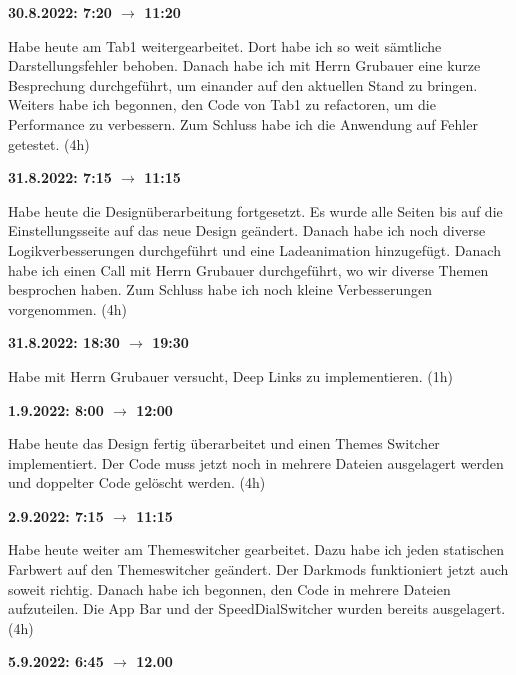 \vspace{0.5cm}

\textbf{30.8.2022: 7:20 $\rightarrow$ 11:20} \

Habe heute am Tab1 weitergearbeitet. Dort habe ich so weit sämtliche Darstellungsfehler behoben. Danach habe ich mit Herrn Grubauer eine kurze Besprechung durchgeführt, um einander auf den aktuellen Stand zu bringen. Weiters habe ich begonnen, den Code von Tab1 zu refactoren, um die Performance zu verbessern. Zum Schluss habe ich die Anwendung auf Fehler getestet. (4h)

\vspace{0.5cm}

\textbf{31.8.2022: 7:15 $\rightarrow$ 11:15} \

Habe heute die Designüberarbeitung fortgesetzt. Es wurde alle Seiten bis auf die Einstellungsseite auf das neue Design geändert. Danach habe ich noch diverse Logikverbesserungen durchgeführt und eine Ladeanimation hinzugefügt. Danach habe ich einen Call mit Herrn Grubauer durchgeführt, wo wir diverse Themen besprochen haben. Zum Schluss habe ich noch kleine Verbesserungen vorgenommen. (4h)

\vspace{0.5cm}

\textbf{31.8.2022: 18:30 $\rightarrow$ 19:30} \

Habe mit Herrn Grubauer versucht, Deep Links zu implementieren. (1h)

\vspace{0.5cm}

\textbf{1.9.2022: 8:00 $\rightarrow$ 12:00} \

Habe heute das Design fertig überarbeitet und einen Themes Switcher implementiert. Der Code muss jetzt noch in mehrere Dateien ausgelagert werden und doppelter Code gelöscht werden. (4h)

\vspace{0.5cm}

\textbf{2.9.2022: 7:15 $\rightarrow$ 11:15} \

Habe heute weiter am Themeswitcher gearbeitet. Dazu habe ich jeden statischen Farbwert auf den Themeswitcher geändert. Der Darkmods funktioniert jetzt auch soweit richtig. Danach habe ich begonnen, den Code in mehrere Dateien aufzuteilen. Die App Bar und der SpeedDialSwitcher wurden bereits ausgelagert. (4h)

\vspace{0.5cm}

\textbf{5.9.2022: 6:45 $\rightarrow$ 12.00} \

